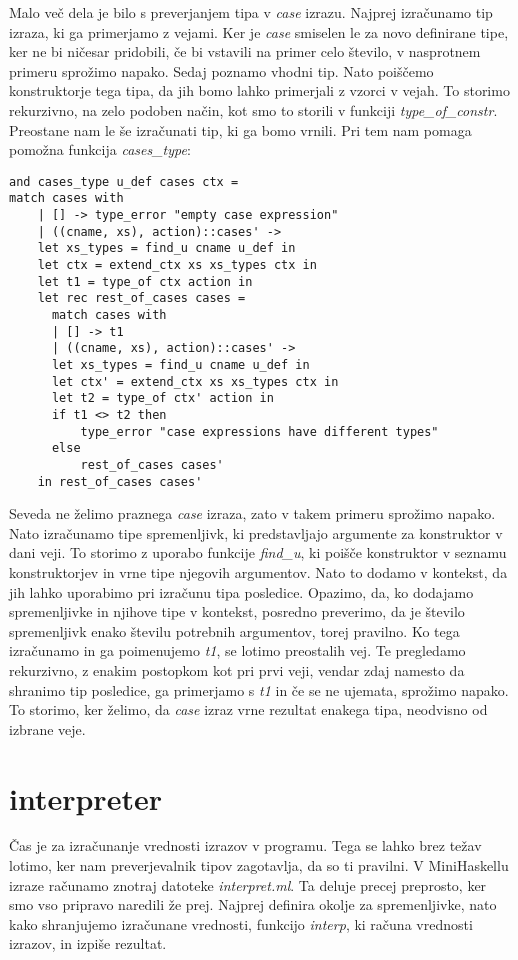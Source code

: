 \documentclass[12pt,a4paper,openany]{book}
\begin{document}
Malo več dela je bilo s preverjanjem tipa v \emph{case} izrazu. Najprej izračunamo tip izraza, ki ga primerjamo z vejami. Ker je \emph{case} smiselen le za novo definirane tipe, ker ne bi ničesar 
pridobili, če bi vstavili na primer celo število, v nasprotnem primeru sprožimo napako. Sedaj poznamo vhodni tip. Nato poiščemo konstruktorje tega tipa, da jih bomo lahko primerjali z vzorci v vejah.
To storimo rekurzivno, na zelo podoben način, kot smo to storili v funkciji \emph{type\_of\_constr}. Preostane nam le še izračunati tip, ki ga bomo vrnili. Pri tem nam pomaga pomožna funkcija 
\emph{cases\_type}:
\begin{lstlisting}
and cases_type u_def cases ctx =
match cases with
    | [] -> type_error "empty case expression"
    | ((cname, xs), action)::cases' ->
    let xs_types = find_u cname u_def in
    let ctx = extend_ctx xs xs_types ctx in
    let t1 = type_of ctx action in
    let rec rest_of_cases cases =
      match cases with
      | [] -> t1
      | ((cname, xs), action)::cases' ->
      let xs_types = find_u cname u_def in
      let ctx' = extend_ctx xs xs_types ctx in
      let t2 = type_of ctx' action in
      if t1 <> t2 then
          type_error "case expressions have different types"
      else
          rest_of_cases cases'
    in rest_of_cases cases'
\end{lstlisting}
Seveda ne želimo praznega \emph{case} izraza, zato v takem primeru sprožimo napako. Nato izračunamo tipe spremenljivk, ki predstavljajo argumente za konstruktor v dani veji. To storimo z uporabo
funkcije \emph{find\_u}, ki poišče konstruktor v seznamu konstruktorjev in vrne tipe njegovih argumentov. Nato to dodamo v kontekst, da jih lahko uporabimo pri izračunu tipa posledice. Opazimo, 
da, ko dodajamo spremenljivke in njihove tipe v kontekst, posredno preverimo, da je število spremenljivk enako številu potrebnih argumentov, torej pravilno. Ko tega izračunamo in ga 
poimenujemo \emph{t1}, se lotimo preostalih vej. Te pregledamo rekurzivno, z enakim postopkom kot pri prvi veji, vendar zdaj namesto da shranimo tip posledice, ga primerjamo s \emph{t1} in če 
se ne ujemata, sprožimo napako. To storimo, ker želimo, da \emph{case} izraz vrne rezultat enakega tipa, neodvisno od izbrane veje.

\section{interpreter}
Čas je za izračunanje vrednosti izrazov v programu. Tega se lahko brez težav lotimo, ker nam preverjevalnik tipov zagotavlja, da so ti pravilni. V MiniHaskellu izraze računamo znotraj datoteke 
\emph{interpret.ml}. Ta deluje precej preprosto, ker smo vso pripravo naredili že prej. Najprej definira okolje za spremenljivke, nato kako shranjujemo izračunane vrednosti, funkcijo 
\emph{interp}, ki računa vrednosti izrazov, in izpiše rezultat. 
\end{document}
